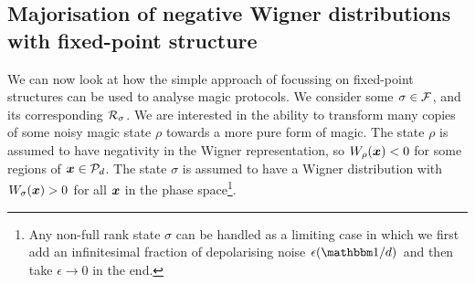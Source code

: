 \documentclass[pra,
aps,
twocolumn,
superscriptaddress,
groupedaddress,
nofootinbib,
reprint
]{revtex4-1}
\begin{document}

\subsection{Majorisation of negative Wigner distributions with fixed-point structure}
\label{sec:major_frag}
We can now look at how the simple approach of focussing on fixed-point structures can be used to analyse magic protocols.
We consider some $\sigma \in {\mathcal F}$, and its corresponding ${\mathcal R}_\sigma$. We are interested in the ability to transform many copies of some noisy magic state $\rho$ towards a more pure form of magic. The state $\rho$ is assumed to have negativity in the Wigner representation, so $W_\rho(\boldsymbol{x}) < 0$ for some regions of $\boldsymbol{x} \in {\mathcal P}_d$. The state $\sigma$ is assumed to have a Wigner distribution with $W_\sigma(\boldsymbol{x}) > 0$ for all $\boldsymbol{x}$ in the phase space\footnote{Any non-full rank state $\sigma$ can be handled as a limiting case in which we first add an infinitesimal fraction of depolarising noise $\epsilon (\id/d)$ and then take $\epsilon \rightarrow 0$ in the end.}.
\end{document}
